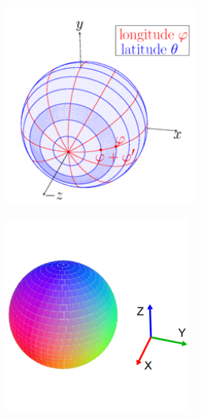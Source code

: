 \documentclass[main.tex]{subfiles}
\begin{document}
\begin{figure}[H]
    \centering
    \hspace{\fill}
    \begin{subfigure}{0.25\textwidth}
        \centering
        \includegraphics[width=\textwidth]{images/accumulatorarray.png}
        \caption[3D-KHT Accumulator Array]{}
        \label{fig:accarr}
    \end{subfigure}
    \hspace{\fill}
    \begin{subfigure}{0.25\textwidth}
        \centering
        \includegraphics[width=\textwidth]{images/accumulatorball.png}

\end{subfigure}
\end{figure}
\end{document}

